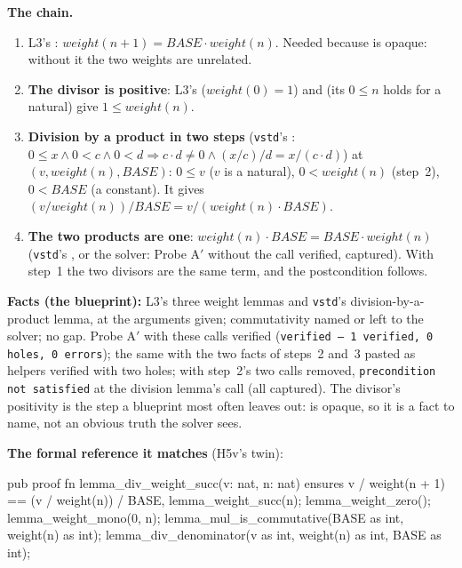 \documentclass[11pt]{article}
\begin{document}
\textbf{The chain.}
\begin{enumerate}
\item L3's : $\mathit{weight}(n + 1) = \mathit{BASE}
  \cdot \mathit{weight}(n)$. Needed because  is opaque: without it
  the two weights are unrelated.
\item \textbf{The divisor is positive}: L3's 
  ($\mathit{weight}(0) = 1$) and  (its
   $0 \leq n$ holds for a natural) give
  $1 \leq \mathit{weight}(n)$.
\item \textbf{Division by a product in two steps} (\texttt{vstd}'s
  : $0 \leq x \wedge 0 < c \wedge 0 < d
  \Rightarrow c \cdot d \neq 0 \wedge (x / c) / d = x / (c \cdot d)$) at
  $(v, \mathit{weight}(n), \mathit{BASE})$: $0 \leq v$ ($v$ is a natural),
  $0 < \mathit{weight}(n)$ (step~2), $0 < \mathit{BASE}$ (a constant). It gives
  $(v / \mathit{weight}(n)) / \mathit{BASE} = v / (\mathit{weight}(n) \cdot
  \mathit{BASE})$.
\item \textbf{The two products are one}: $\mathit{weight}(n) \cdot
  \mathit{BASE} = \mathit{BASE} \cdot \mathit{weight}(n)$
  (\texttt{vstd}'s , or the solver: Probe A$'$
  without the call verified, captured). With step~1 the two divisors are the
  same term, and the postcondition follows.
\end{enumerate}
\textbf{Facts (the blueprint):} L3's three weight lemmas and \texttt{vstd}'s
division-by-a-product lemma, at the arguments given; commutativity named or
left to the solver; no gap. Probe A$'$ with these calls verified
(\texttt{verified --- 1 verified, 0 holes, 0 errors}); the same with the two
facts of steps~2 and~3 pasted as helpers verified with two holes; with step~2's
two calls removed, \texttt{precondition not satisfied} at the division lemma's
call (all captured). The divisor's positivity is the step a blueprint most often
leaves out:  is opaque, so it is a fact to name, not an obvious
truth the solver sees.

\textbf{The formal reference it matches} (H5v's twin):
\begin{veruscode}
pub proof fn lemma_div_weight_succ(v: nat, n: nat)
    ensures
        v / weight(n + 1) == (v / weight(n)) / BASE,
{
    lemma_weight_succ(n);
    lemma_weight_zero();
    lemma_weight_mono(0, n);
    lemma_mul_is_commutative(BASE as int, weight(n) as int);
    lemma_div_denominator(v as int, weight(n) as int, BASE as int);
}
\end{veruscode}
\end{document}
